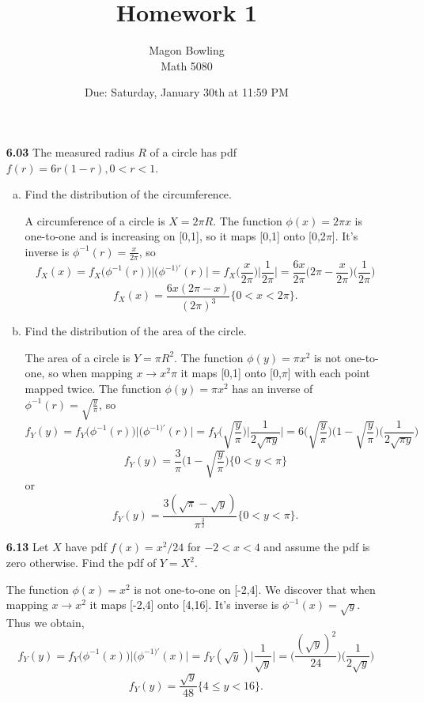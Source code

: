 \documentclass[11pt]{article}
\theoremstyle{definition}
\newcommand{\1}[1]{\mathbf{1} \left \{ #1 \right \}}
\begin{document}
\title{Homework 1}
\date{Due: Saturday, January 30th at 11:59 PM}
\author{Magon Bowling \\ Math 5080}

\maketitle

\begin{itemize}

\item [{\color{red} \textbf{6.03}}] The measured radius $R$ of a circle has pdf $f(r) = 6r(1-r), 0 < r < 1$.
\begin{enumerate}[(a)]
\item Find the distribution of the circumference.

A circumference of a circle is \(X = 2 \pi R\).  The function \(\phi(x) = 2 \pi x \) is one-to-one and is increasing on [0,1], so it maps [0,1] onto [0,2$\pi$].  It's inverse is \(\phi^{-1}(r) = \frac{x}{2\pi}\), so
\[f_X (x) = f_X \big(\phi^{-1}(r)\big) \Big|(\phi^{-1)\prime}(r)\Big| = f_X \bigg(\frac{x}{2\pi}\bigg) \bigg|\frac{1}{2\pi}\bigg| = \frac{6x}{2\pi} \bigg(2\pi - \frac{x}{2\pi}\bigg) \bigg(\frac{1}{2\pi}\bigg)\]
\[f_X (x) = \frac{6x(2\pi - x)}{(2\pi)^3} \{0<x<2\pi\}. \]


\item Find the distribution of the area of the circle.

The area of a circle is \(Y = \pi R^2\).  The function \(\phi(y) = \pi x^2 \) is not one-to-one, so when mapping \(x \rightarrow x^2 \pi\) it maps [0,1] onto [0,$\pi$] with each point mapped twice.  The function \(\phi(y) = \pi x^2 \) has an inverse of \(\phi^{-1}(r) = \sqrt{\frac{y}{\pi}}\), so
\[f_Y (y) = f_Y \big(\phi^{-1}(r)\big)\Big|(\phi^{-1)\prime}(r)\Big| = f_Y \bigg(\sqrt{\frac{y}{\pi}}\bigg) \bigg|\frac{1}{2\sqrt{\pi y}}\bigg| = 6 \bigg(\sqrt{\frac{y}{\pi}}\bigg) \bigg(1 - \sqrt{\frac{y}{\pi}}\bigg) \bigg(\frac{1}{2\sqrt{\pi y}}\bigg)\]
\[f_Y (y) = \frac{3}{\pi} \bigg(1 - \sqrt{\frac{y}{\pi}}\bigg)  \{0<y<\pi\} \]
or
\[f_Y (y) = \frac{3(\sqrt{\pi} - \sqrt{y})}{\pi^\frac{3}{2}}  \{0<y<\pi\}. \]

\end{enumerate}

\item [{\color{red} \textbf{6.13}}] Let $X$ have pdf $f(x) = x^2/24$ for $-2 < x < 4$ and assume the pdf is zero otherwise. Find the pdf of $Y = X^2$.

The function \(\phi(x) = x^2\) is not one-to-one on [-2,4].  We discover that when mapping \(x \rightarrow x^2\) it maps [-2,4] onto [4,16].  It's inverse is \(\phi^{-1}(x) = \sqrt{y}\).  Thus we obtain,
\[f_Y (y) = f_Y \big(\phi^{-1}(x)\big)\Big|(\phi^{-1)\prime}(x)\Big| = f_Y (\sqrt{y}) \bigg|\frac{1}{\sqrt{y}}\bigg| = \bigg(\frac{(\sqrt{y})^2}{24}\bigg) \bigg(\frac{1}{2\sqrt{y}}\bigg) \]
\[f_Y (y) = \frac{\sqrt{y}}{48} \{4\leq y<16\}. \]

\end{itemize}
\end{document}
